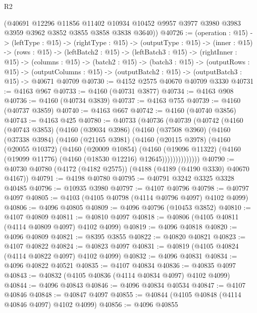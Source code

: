 \begin{lexlean}{R2}
\begin{coremodule}
      (@40691
        @12296
        @11856
        @11402
        @10934
        @10452
        @9957
        @3977
        @3980
        @3983
        @3959
        @3962
        @3852
        @3855
        @3858
        @3838
        @3640))
@40726 := (operation : @15) ->
  (leftType : @15) ->
  (rightType : @15) ->
  (outputType : @15) ->
  (inner : @15) ->
  (rows : @15) ->
  (leftBatch2 : @15) ->
  (leftBatch3 : @15) ->
  (rightInner : @15) ->
  (columns : @15) ->
  (batch2 : @15) ->
  (batch3 : @15) ->
  (outputRows : @15) ->
  (outputColumns : @15) -> (outputBatch2 : @15) -> (outputBatch3 : @15) -> @40671 @40709
@40730 := @4152 @2575 @40670 @40709 @3330
@40731 := @4163 @967
@40733 := @4160 (@40731 @3877)
@40734 := @4163 @908
@40736 := @4160 (@40734 @3839)
@40737 := @4163 @755
@40739 := @4160 (@40737 @3859)
@40740 := @4163 @667
@40742 := @4160 (@40740 @3856)
@40743 := @4163 @425
@40780 := @40733
    (@40736
      (@40739
        (@40742
          (@4160
            (@40743 @3853)
            (@4160
              (@39034 @3986)
              (@4160
                (@37508 @3960)
                (@4160
                  (@37338 @3984)
                  (@4160
                    (@21165 @3981)
                    (@4160
                      (@20115 @3978)
                      (@4160
                        (@20055 @10372)
                        (@4160
                          (@20009 @10854)
                          (@4160
                            (@19096 @11322)
                            (@4160 (@19099 @11776) (@4160 (@18530 @12216) @12645))))))))))))))
@40790 := @40730 @40780 (@4172 (@4182 @2575)) (@4188 (@4189 (@4190 @3330) @40670 @4167))
@40791 := @4198 @40780
@40795 := @40791 @3242 @3325 @3328 @40485
@40796 := @10935 @3980
@40797 := @4107 @40796
@40798 := @40797 @4097
@40805 := @4103 (@4105 @40798 (@4114 @40796 @4097) @4102 @4099)
@40806 := @4096 @40805
@40809 := @4096 @40796 (@10453 @3852)
@40810 := @4107 @40809
@40811 := @40810 @4097
@40818 := @40806 (@4105 @40811 (@4114 @40809 @4097) @4102 @4099)
@40819 := @4096 @40818
@40820 := @4096 @40809
@40821 := @8395 @3855
@40822 := @40820 @40821
@40823 := @4107 @40822
@40824 := @40823 @4097
@40831 := @40819 (@4105 @40824 (@4114 @40822 @4097) @4102 @4099)
@40832 := @4096 @40831
@40834 := @4096 @40822 @40521
@40835 := @4107 @40834
@40836 := @40835 @4097
@40843 := @40832 (@4105 @40836 (@4114 @40834 @4097) @4102 @4099)
@40844 := @4096 @40843
@40846 := @4096 @40834 @40534
@40847 := @4107 @40846
@40848 := @40847 @4097
@40855 := @40844 (@4105 @40848 (@4114 @40846 @4097) @4102 @4099)
@40856 := @4096 @40855

\end{coremodule}
\end{lexlean}
